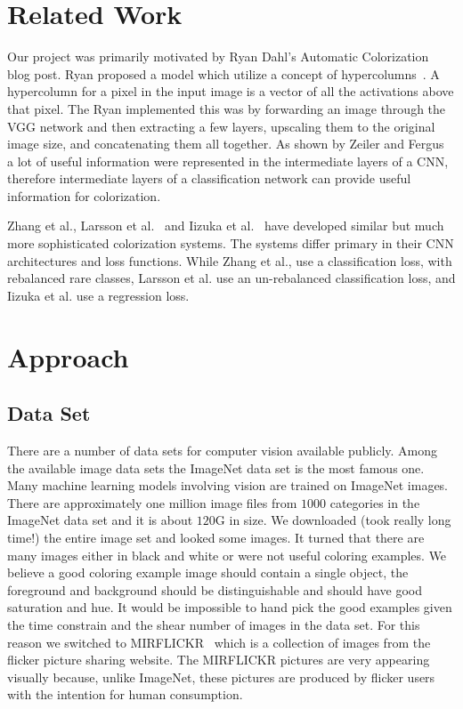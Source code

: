 \documentclass[12pt]{article}
\begin{document}
\section{Related Work}
Our project was primarily motivated by Ryan Dahl's Automatic Colorization~\cite{RYAN2016} blog post. Ryan proposed a model which utilize a concept of hypercolumns~\cite{HYPERCOL}. A hypercolumn for a pixel in the input image is a vector of all the activations above that pixel. The Ryan implemented this was by forwarding an image through the VGG network and then extracting a few layers, upscaling them to the original image size, and concatenating them all together. As shown by Zeiler and Fergus~\cite{Zeiler} a lot of useful information were represented in the intermediate layers of a CNN, therefore intermediate layers of a classification network can provide useful information for colorization.

Zhang et al., Larsson et al.~\cite{Zhang}  and Iizuka et al.~\cite{Iizuka} have developed similar but much more sophisticated colorization systems. The systems differ primary in their CNN architectures and loss functions. While Zhang et al., use a classification loss, with rebalanced rare classes, Larsson et al. use an un-rebalanced classification loss, and Iizuka et al. use a regression loss.


\section{Approach}

\subsection{Data Set}
There are a number of data sets for computer vision available publicly. Among the available image data sets the ImageNet data set is the most famous one. Many machine learning models involving vision are trained on ImageNet images. There are approximately one million image files from $1000$ categories in the ImageNet data set and it is about $120$G in size. We downloaded (took really long time!) the entire image set and looked some images. It turned that there are many images either in black and white or were not useful coloring examples. We believe a good coloring example image should contain a single object, the foreground and background should be distinguishable and should have good saturation and hue. It would be impossible to hand pick the good examples given the time constrain and the shear number of images in the data set. For this reason we switched to MIRFLICKR~\cite{MIR08} which is a collection of images from the flicker picture sharing website. The MIRFLICKR pictures are very appearing visually because, unlike ImageNet, these pictures are produced by flicker users with the intention for human consumption.  
\end{document}
